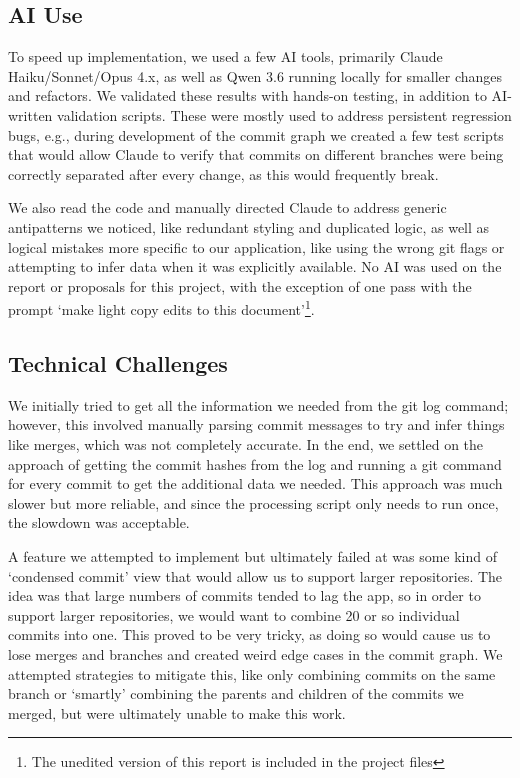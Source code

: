 \documentclass[12 pt]{article}
\begin{document}
\subsection{AI Use}
To speed up implementation, we used a few AI tools, primarily Claude
Haiku/Sonnet/Opus 4.x, as well as Qwen 3.6 running locally for smaller changes and
refactors. We validated these results with hands-on testing, in addition to AI-written
validation scripts. These were mostly used to address persistent regression bugs, e.g.,
during development of the commit graph we created a few test scripts that would
allow Claude to verify that commits on different branches were being correctly
separated after every change, as this would frequently break. \par
We also read
the code and manually directed Claude to address generic antipatterns we noticed, like
redundant styling and duplicated logic, as well as logical mistakes more specific
to our application, like using the wrong git flags or attempting to infer data when it was
explicitly available. No AI was used on the report or proposals for this
project, with the exception of one pass with the prompt `make light copy edits
to this document'\footnote{The unedited version of this report is included in the project
files}.
\par
\subsection{Technical Challenges}
We initially tried to get all
the information we needed from the git log command; however, this involved manually parsing
commit messages to try and infer things like merges, which was not completely
accurate. In the end, we settled on the approach of getting the commit hashes
from the log and running a git command for every commit to get the additional
data we needed. This
approach was much slower but more reliable, and since the processing script only
needs to run once, the slowdown was acceptable. \par
A feature we attempted to implement but ultimately failed at was some kind
of `condensed commit' view that would allow us to support larger repositories.
The idea was that large numbers of commits tended to lag the app, so in
order to support larger repositories, we would want to combine 20 or so individual
commits into one. This proved to be very tricky, as doing so would cause us to
lose merges and branches and created weird edge cases in the commit graph. We
attempted strategies to mitigate this, like only combining commits on the
same branch or `smartly' combining the parents and children of the
commits we merged, but were ultimately unable to make this work. \par
\end{document}
